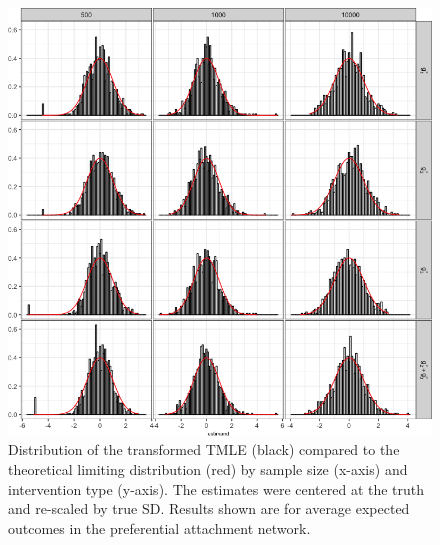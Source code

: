 \documentclass[english]{article}\usepackage[]{graphicx}\usepackage[]{color}
\makeatletter
\def\maxwidth{ %
  \ifdim\Gin@nat@width>\linewidth
    \linewidth
  \else
    \Gin@nat@width
  \fi
}
\newenvironment{knitrout}{}{} %
\theoremstyle{plain}
\theoremstyle{plain}
\makeatother
\begin{document}
\begin{knitrout}\footnotesize
{}\color{fgcolor}\begin{figure}

{\centering \includegraphics[width=\maxwidth]{TablesFigs/knitR-hist_TMLE_EY_prefattach-1} 

}

\caption[Distribution of the transformed TMLE (black) compared to the theoretical limiting distribution (red) by sample size (x-axis) and intervention type (y-axis)]{Distribution of the transformed TMLE (black) compared to the theoretical limiting distribution (red) by sample size (x-axis) and intervention type (y-axis). The estimates were centered at the truth and re-scaled by true SD. Results shown are for average expected outcomes in the preferential attachment network.}\label{fig:hist.TMLE.EY.prefattach}
\end{figure}


\end{knitrout}
\end{document}
